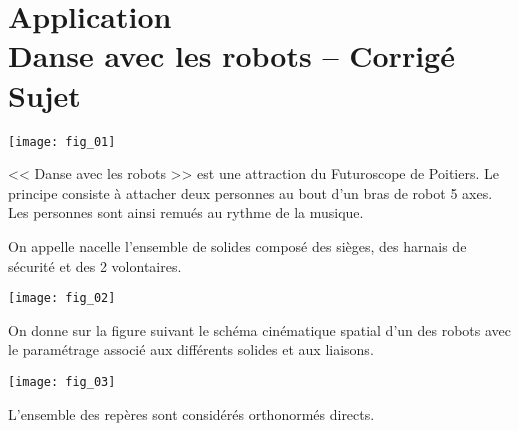 \chapter*{Application  \\ 
Danse avec les robots -- \ifprof Corrigé \else Sujet \fi}

\iflivret {} \else
\ifprof  {} \else \fi
\fi

\setcounter{question}{0}
\marginnote[1cm]{
}

\begin{marginfigure}
\texttt{[image: fig\_01]}
\end{marginfigure}



<< Danse avec les robots >> est une attraction du Futuroscope de Poitiers. Le principe consiste à attacher deux personnes au bout d'un bras de robot 5 axes. Les personnes sont ainsi remués au rythme de la musique.

On appelle nacelle l'ensemble de solides composé des sièges, des harnais de sécurité et des 2 volontaires. 

\begin{center}
\texttt{[image: fig\_02]}
\end{center}


On donne sur la figure suivant le schéma cinématique spatial d'un des robots avec le paramétrage associé aux différents solides et aux liaisons. 

\begin{center}
\texttt{[image: fig\_03]}
\end{center}

L'ensemble des repères sont considérés orthonormés directs.


